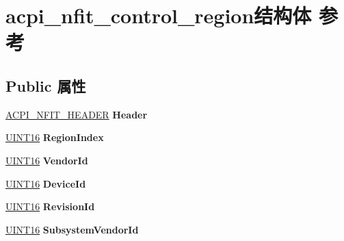 \hypertarget{structacpi__nfit__control__region}{}\section{acpi\+\_\+nfit\+\_\+control\+\_\+region结构体 参考}
\label{structacpi__nfit__control__region}
\subsection*{Public 属性}
\begin{DoxyCompactItemize}
\item 
\mbox{\label{structacpi__nfit__control__region_aa842de197ef3f2ec7215ce450dec4beb}} 
\hyperlink{structacpi__nfit__header}{A\+C\+P\+I\+\_\+\+N\+F\+I\+T\+\_\+\+H\+E\+A\+D\+ER} {\bfseries Header}
\item 
\mbox{\label{structacpi__nfit__control__region_ac4ce66a1e40a44855607de686b17bf88}} 
\hyperlink{_processor_bind_8h_a09f1a1fb2293e33483cc8d44aefb1eb1}{U\+I\+N\+T16} {\bfseries Region\+Index}
\item 
\mbox{\label{structacpi__nfit__control__region_a2349e5de034451adc82fd3c6ee181e26}} 
\hyperlink{_processor_bind_8h_a09f1a1fb2293e33483cc8d44aefb1eb1}{U\+I\+N\+T16} {\bfseries Vendor\+Id}
\item 
\mbox{\label{structacpi__nfit__control__region_acb9cb66e9112ab73f3964ff43fccfe1c}} 
\hyperlink{_processor_bind_8h_a09f1a1fb2293e33483cc8d44aefb1eb1}{U\+I\+N\+T16} {\bfseries Device\+Id}
\item 
\mbox{\label{structacpi__nfit__control__region_af5dc2812b995caf8956fe40d7154a708}} 
\hyperlink{_processor_bind_8h_a09f1a1fb2293e33483cc8d44aefb1eb1}{U\+I\+N\+T16} {\bfseries Revision\+Id}
\item 
\mbox{\label{structacpi__nfit__control__region_a92c3d3c4f4c3cea19f6282e7da36eb12}} 
\hyperlink{_processor_bind_8h_a09f1a1fb2293e33483cc8d44aefb1eb1}{U\+I\+N\+T16} {\bfseries Subsystem\+Vendor\+Id}
\item 

\end{DoxyCompactItemize}
